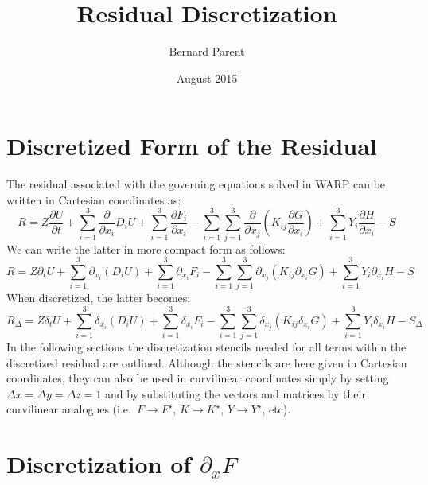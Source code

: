 \documentclass{warpdoc}
\author{
  Bernard Parent
}
\title{
  Residual Discretization 
}
\date{
  August 2015
}
\begin{document}
\sloppy
  \pagestyle{headings}
  \setcounter{page}{1}
  \makewarpdoctitle
  \tableofcontents



\section{Discretized Form of the Residual}

The residual associated with the governing equations solved in WARP can be written in Cartesian coordinates as:
%
\begin{equation}
 R=   Z\frac{\partial U}{\partial t} + \sum_{i=1}^3  \frac{\partial }{\partial x_i} D_i U
   + \sum_{i=1}^3 \frac{\partial F_i}{\partial x_i} 
     - \sum_{i=1}^3 \sum_{j=1}^3 \frac{\partial }{\partial x_j}\left( K_{ij} \frac{\partial G}{\partial x_i} \right)
     +\sum_{i=1}^3 Y_i \frac{\partial H}{\partial x_i}  
   -S
\end{equation}
%
We can write the latter in more compact form as follows:
%
\begin{equation}
 R=   Z \partial_t U + \sum_{i=1}^3  \partial_{x_i} (D_i U)
   + \sum_{i=1}^3 \partial_{x_i} F_i 
     - \sum_{i=1}^3 \sum_{j=1}^3 \partial_{x_j}\left( K_{ij}  \partial_{x_i}G \right)
     +\sum_{i=1}^3 Y_i  \partial_{x_i} H  
   -S
\end{equation}
%
When discretized, the latter becomes:
%
\begin{equation}
R_\Delta = Z\delta_t U + \sum_{i=1}^3  \delta_{x_i} (D_i U)
   + \sum_{i=1}^3 \delta_{x_i} F_i 
     - \sum_{i=1}^3 \sum_{j=1}^3 \delta_{x_j}\left( K_{ij} \delta_{x_i} G \right)
     +\sum_{i=1}^3 Y_i \delta_{x_i} H -S_\Delta
\end{equation}
%
In the following sections the discretization stencils needed for all terms within the discretized residual are outlined.
Although the stencils are here given in Cartesian coordinates, they can also be used in curvilinear coordinates simply by setting $\Delta x =\Delta y =\Delta z =1$ and by substituting the vectors and matrices by their curvilinear analogues (i.e.\ $F \rightarrow F^\star$, $K \rightarrow K^\star$, $Y \rightarrow Y^\star$, etc).



\section{Discretization of $\partial_x F$}
\end{document}
